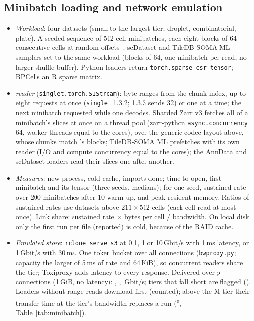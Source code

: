 \subsection{Minibatch loading and network emulation}
\begin{itemize}\itemsep 1pt
\item \emph{Workload}: four datasets (small to the largest tier; droplet, combinatorial, plate). A seeded sequence of
  512-cell minibatches, each eight blocks of 64 consecutive cells at random offsets~\cite{dascenzo2025scdataset}.
  scDataset and TileDB-SOMA ML samplers set to the same workload (blocks of 64, one minibatch per read, no larger
  shuffle buffer). Python loaders return \texttt{torch.sparse\_csr\_tensor}; BPCells an R sparse matrix.
\item \emph{\sone{} reader} (\texttt{singlet.torch.S1Stream}): byte ranges from the chunk index, up to eight requests at
  once (\texttt{singlet} 1.3.2; 1.3.3 sends 32) or one at a time; the next minibatch requested while one decodes.
  Sharded Zarr v3 fetches all of a minibatch's slices at once on a thread pool (zarr-python \texttt{async.concurrency}
  64, worker threads equal to the cores), over the generic-codec layout above, whose chunks match \sone's blocks;
  TileDB-SOMA ML prefetches with its own reader (I/O and compute concurrency equal to the cores); the AnnData and
  scDataset loaders read their slices one after another.
\item \emph{Measures}: new process, cold cache, imports done; time to open, first minibatch and its tensor (three seeds,
  medians); for one seed, sustained rate over 200 minibatches after 10 warm-up, and peak resident memory. Ratios of
  sustained rates use datasets above $211\times512$ cells (each cell read at most once). Link share: sustained rate $\times$
  bytes per cell $/$ bandwidth. On local disk only the first \sone{} run per file (reported) is cold, because of the RAID
  cache.
\item \emph{Emulated store}: \texttt{rclone serve s3} at 0.1, 1 or 10\,Gbit/s with 1\,ms latency, or 1\,Gbit/s with
  30\,ms. One token bucket over all connections (\texttt{bwproxy.py}; capacity the larger of 5\,ms of rate and
  64\,KiB), so concurrent readers share the tier; Toxiproxy adds latency to every response. Delivered over $p$
  connections (1\,GiB, no latency): , , \,Gbit/s;
  tiers that fall short are flagged (). Loaders without range reads download first (counted); above the M
  tier their transfer time at the tier's bandwidth replaces a run (\textsuperscript{e}, Table~\ref{tab:minibatch}).

\end{itemize}
